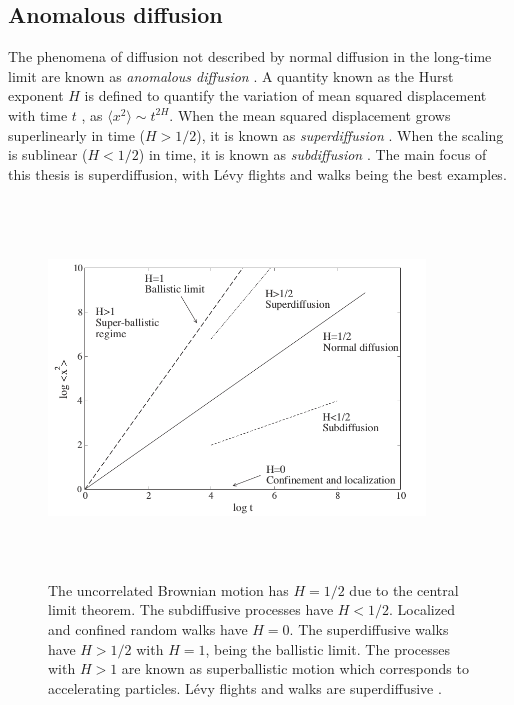 \documentclass[12pt]{report}
\begin{document}
\begin{justify}
\section{Anomalous diffusion}
The phenomena of diffusion not described by normal diffusion in the long-time limit are known as \textit{anomalous diffusion} \cite{anomalousDiff}. A quantity known as the Hurst exponent $H$ is defined to quantify the variation of mean squared displacement with time $t$ \cite{hurst}, as $\langle x^2 \rangle \sim t^{2H}$. When the mean squared displacement grows superlinearly  in time ($H > 1/2$), it is known as \textit{superdiffusion} \cite{superSub}. When the scaling is sublinear ($H < 1/2$) in time, it is known as \textit{subdiffusion} \cite{superSub}. The main focus of this thesis is superdiffusion, with L\'evy flights and walks being the best examples.

\begin{figure}[H]
\centering
\includegraphics[height= 10cm, width = 10cm, keepaspectratio]{Hurst.png}
\caption{The uncorrelated Brownian motion has $H = 1/2$ due to the central limit theorem. The subdiffusive processes have $H < 1/2$. Localized and confined random walks have $H = 0$. The superdiffusive walks have $H > 1/2$ with $H = 1$, being the ballistic limit. The processes with $H > 1$ are known as superballistic motion which corresponds to accelerating particles. L\'evy flights and walks are superdiffusive \cite{physofforaging}.}
\label{fig:hurst}
\end{figure}




\end{justify}
\end{document}

